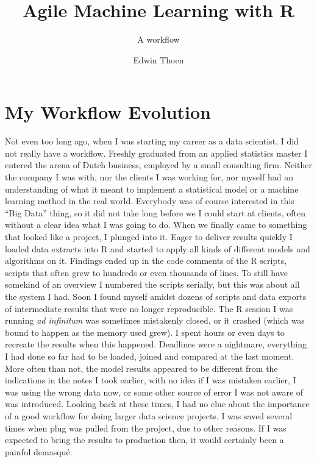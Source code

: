 \documentclass[]{book}
\title{Agile Machine Learning with R}
\subtitle{A workflow}
\author{Edwin Thoen}
\date{}
\begin{document}
\maketitle

{
\setcounter{tocdepth}{1}
\tableofcontents
}
\hypertarget{my-workflow-evolution}{%
\chapter{My Workflow Evolution}\label{my-workflow-evolution}}

Not even too long ago, when I was starting my career as a data scientist, I did not really have a workflow. Freshly graduated from an applied statistics master I entered the arena of Dutch business, employed by a small consulting firm. Neither the company I was with, nor the clients I was working for, nor myself had an understanding of what it meant to implement a statistical model or a machine learning method in the real world. Everybody was of course interested in this ``Big Data'' thing, so it did not take long before we I could start at clients, often without a clear idea what I was going to do. When we finally came to something that looked like a project, I plunged into it. Eager to deliver results quickly I loaded data extracts into R and started to apply all kinds of different models and algorithms on it. Findings ended up in the code comments of the R scripts, scripts that often grew to hundreds or even thousands of lines. To still have somekind of an overview I numbered the scripts serially, but this was about all the system I had. Soon I found myself amidst dozens of scripts and data exports of intermediate results that were no longer reproducible. The R session I was running \emph{ad infinitum} was sometimes mistakenly closed, or it crashed (which was bound to happen as the memory used grew). I spent hours or even days to recreate the results when this happened. Deadlines were a nightmare, everything I had done so far had to be loaded, joined and compared at the last moment. More often than not, the model results appeared to be different from the indications in the notes I took earlier, with no idea if I was mistaken earlier, I was using the wrong data now, or some other source of error I was not aware of was introduced. Looking back at these times, I had no clue about the importance of a good workflow for doing larger data science projects. I was saved several times when plug was pulled from the project, due to other reasons. If I was expected to bring the results to production then, it would certainly been a painful demasqué.
\end{document}
